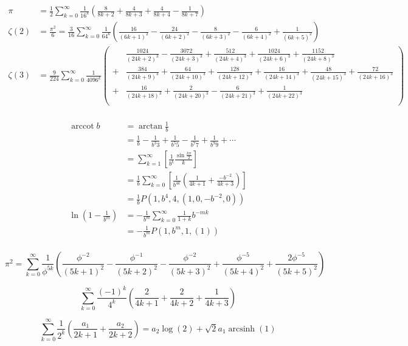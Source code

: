 $$\begin{aligned}
\pi &= \frac{1}{2}\sum\limits_{k = 0}^\infty {\frac{1}{{16}^k}} \left( {\frac{8}{8k + 2} + \frac{4}{8k + 3} + \frac{4}{8k + 4} - \frac{1}{8k + 7}} \right)\\
\zeta (2) &= \frac{\pi^2}{6} = \frac{3}{16}\sum\limits_{k = 0}^\infty {\frac{1}{{64}^k}} \left( {\frac{16}{{(6k + 1)}^2} - \frac{24}{{(6k + 2)}^2} - \frac{8}{{(6k + 3)}^2} - \frac{6}{{(6k + 4)}^2} + \frac{1}{{(6k + 5)}^2}} \right)\\
\zeta (3) &= \frac{9}{224}\sum\limits_{k = 0}^\infty {\frac{1}{{4096}^k}}
\left(\begin{aligned}
&\frac{1024}{{(24k + 2)}^3} - \frac{3072}{{(24k + 3)}^3} + \frac{512}{{(24k + 4)}^3} + \frac{1024}{{(24k + 6)}^3} + \frac{1152}{{(24k + 8)}^3}\\
+& \frac{384}{{(24k + 9)}^3} + \frac{64}{{(24k + 10)}^3} + \frac{128}{{(24k + 12)}^3} + \frac{16}{{(24k + 14)}^3} + \frac{48}{{(24k + 15)}^3} + \frac{72}{{(24k + 16)}^3}\\
+& \frac{16}{{(24k + 18)}^3} + \frac{2}{{(24k + 20)}^3} - \frac{6}{{(24k + 21)}^3} + \frac{1}{{(24k + 22)}^3}\\
\end{aligned} \right)\\
\end{aligned}$$

$$\begin{aligned}
\operatorname{arccot} b &= \arctan {\frac {1}{b}}\\
&={\frac {1}{b}}-{\frac {1}{b^{3}3}}+{\frac {1}{b^{5}5}}-{\frac {1}{b^{7}7}}+{\frac {1}{b^{9}9}}+\cdots \\
&=\sum _{k=1}^{\infty }\left[{\frac {1}{b^{k}}}{\frac {\sin {\frac {k\pi }{2}}}{k}}\right]\\
&={\frac {1}{b}}\sum _{k=0}^{\infty }\left[{\frac {1}{b^{4k}}}\left({\frac {1}{4k+1}}+{\frac {-b^{-2}}{4k+3}}\right)\right]\\
&={\frac {1}{b}}P\left(1,b^{4},4,(1,0,-b^{-2},0)\right)\\
\ln \left({1 - \frac{1}{b^m}} \right) &= - \frac{1}{b^m}\sum\limits_{k = 0}^\infty {\frac{1}{1 + k}{b^{ - mk}}} \\
&= - \frac{1}{b^m}P(1,{b^m},1,(1))\\
\end{aligned}$$

$${\pi^2} = \sum\limits_{k = 0}^\infty {\frac{1}{\phi^{5k}}\left( {\frac{\phi^{ - 2}}{{{{\left( {5k + 1} \right)}^2}}} - \frac{\phi^{ - 1}}{{{{\left( {5k + 2} \right)}^2}}} - \frac{\phi^{ - 2}}{{{{\left( {5k + 3} \right)}^2}}} + \frac{\phi^{ - 5}}{{{{\left( {5k + 4} \right)}^2}}} + \frac{{2{\phi^{ - 5}}}}{{{{\left( {5k + 5} \right)}^2}}}} \right)}$$

$$\sum\limits_{k = 0}^\infty {\frac{{(-1)}^k}{4^k}\left( {\frac{2}{4k + 1} + \frac{2}{4k + 2} + \frac{1}{4k + 3}} \right)}$$

$$\sum_{k = 0}^\infty {\frac{1}{2^k}\left( {\frac{a_1}{2k + 1} + \frac{a_2}{2k + 2}} \right)} = {a_2}\log (2) + \sqrt 2 {a_1}{\operatorname{arcsinh}}(1)$$


